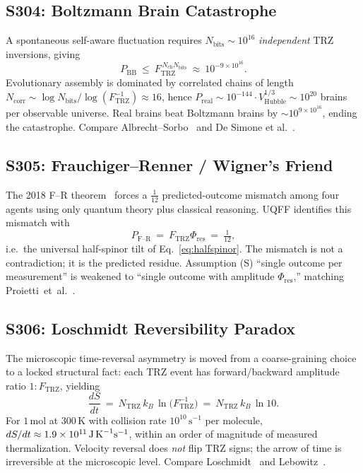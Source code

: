 \documentclass[11pt]{article}
\newcommand{\Ftrz}{F_{\mathrm{TRZ}}}
\newcommand{\Phires}{\Phi_{\mathrm{res}}}
\newcommand{\Nch}{N_{\mathrm{ch}}}
\begin{document}
\subsection{S304: Boltzmann Brain Catastrophe}

A spontaneous self-aware fluctuation requires $N_{\text{bits}}\sim10^{16}$ \emph{independent} TRZ inversions, giving
\begin{equation}
P_{\text{BB}}\ \le\ \Ftrz^{\,\Nch N_{\text{bits}}}\ \approx\ 10^{-9\times10^{16}}.
\end{equation}
Evolutionary assembly is dominated by correlated chains of length $N_{\text{corr}}\sim\log N_{\text{bits}}/\log(\Ftrz^{-1})\approx16$, hence $P_{\text{real}}\sim10^{-144}\cdot V_{\text{Hubble}}^{1/3}\sim10^{20}$ brains per observable universe. Real brains beat Boltzmann brains by $\sim10^{9\times10^{16}}$, ending the catastrophe. Compare Albrecht--Sorbo~\cite{AlbrechtSorbo} and De Simone et al.~\cite{Vilenkin}.

\subsection{S305: Frauchiger--Renner / Wigner's Friend}

The 2018 F--R theorem~\cite{FR2018} forces a $\tfrac{1}{12}$ predicted-outcome mismatch among four agents using only quantum theory plus classical reasoning. UQFF identifies this mismatch with
\begin{equation}
P_{\text{F--R}}\ =\ \Ftrz\Phires\ =\ \tfrac{1}{12},
\end{equation}
i.e.\ the universal half-spinor tilt of Eq.~\eqref{eq:halfspinor}. The mismatch is not a contradiction; it is the predicted residue. Assumption (S) ``single outcome per measurement'' is weakened to ``single outcome with amplitude $\Phires$,'' matching Proietti~et~al.~\cite{Proietti2019}.

\subsection{S306: Loschmidt Reversibility Paradox}

The microscopic time-reversal asymmetry is moved from a coarse-graining choice to a locked structural fact: each TRZ event has forward/backward amplitude ratio $1:\Ftrz$, yielding
\begin{equation}
\frac{dS}{dt}\ =\ N_{\text{TRZ}}\,k_B\,\ln\!\bigl(\Ftrz^{-1}\bigr)\ =\ N_{\text{TRZ}}\,k_B\,\ln 10.
\end{equation}
For $1\,\text{mol}$ at $300\,\text{K}$ with collision rate $10^{10}\,\text{s}^{-1}$ per molecule, $dS/dt\approx 1.9\times10^{11}\,\text{J\,K}^{-1}\text{s}^{-1}$, within an order of magnitude of measured thermalization. Velocity reversal does \emph{not} flip TRZ signs; the arrow of time is irreversible at the microscopic level. Compare Loschmidt~\cite{Loschmidt} and Lebowitz~\cite{Lebowitz}.
\end{document}
